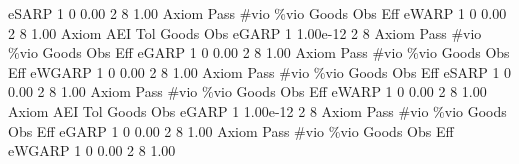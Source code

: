        eSARP {\VBAR}    1           0        0.00           2           8        1.00  
{\smallskip}
{\smallskip}
{\smallskip}
       Axiom {\VBAR} Pass        \#vio        \%vio       Goods         Obs         Eff  
       eWARP {\VBAR}    1           0        0.00           2           8        1.00  
{\smallskip}
       Axiom {\VBAR}       AEI        Tol      Goods        Obs 
       eGARP {\VBAR}         1   1.00e-12          2          8 
{\smallskip}
{\smallskip}
{\smallskip}
       Axiom {\VBAR} Pass        \#vio        \%vio       Goods         Obs         Eff  
       eGARP {\VBAR}    1           0        0.00           2           8        1.00  
{\smallskip}
{\smallskip}
{\smallskip}
       Axiom {\VBAR} Pass        \#vio        \%vio       Goods         Obs         Eff  
      eWGARP {\VBAR}    1           0        0.00           2           8        1.00  
{\smallskip}
{\smallskip}
{\smallskip}
       Axiom {\VBAR} Pass        \#vio        \%vio       Goods         Obs         Eff  
       eSARP {\VBAR}    1           0        0.00           2           8        1.00  
{\smallskip}
{\smallskip}
{\smallskip}
       Axiom {\VBAR} Pass        \#vio        \%vio       Goods         Obs         Eff  
       eWARP {\VBAR}    1           0        0.00           2           8        1.00  
{\smallskip}
       Axiom {\VBAR}       AEI        Tol      Goods        Obs 
       eGARP {\VBAR}         1   1.00e-12          2          8 
{\smallskip}
{\smallskip}
{\smallskip}
       Axiom {\VBAR} Pass        \#vio        \%vio       Goods         Obs         Eff  
       eGARP {\VBAR}    1           0        0.00           2           8        1.00  
{\smallskip}
{\smallskip}
{\smallskip}
       Axiom {\VBAR} Pass        \#vio        \%vio       Goods         Obs         Eff  
      eWGARP {\VBAR}    1           0        0.00           2           8        1.00  
{\smallskip}
{\smallskip}
{\smallskip}
